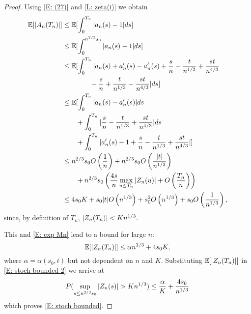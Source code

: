 \begin{proof}
    Using \ref{E: (27)} and \ref{L: zeta(i)} we obtain
    \begin{align*}
    \mathbb{E}[|A_n(T_n)|] &\leq \mathbb{E}[\int_{0}^{T_n} |a_n(s)-1|ds] \\
    &\leq \mathbb{E}[\int_{0}^{n^{2 / 3}s_0} |a_n(s)-1|ds] \\
    &\leq \mathbb{E}[
    	\int_{0}^{T_n} | a_n(s) + a'_n(s) - a'_n(s) + \frac{s}{n} - \frac{t}{n^{1 / 3}} + \frac{st}{n^{4 / 3}
    	} \\
    &\qquad \qquad - \frac{s}{n} + \frac{t}{n^{1 / 3}} - \frac{st}{n^{4 / 3}} | ds] \\
    &\leq \mathbb{E}[
    	\int_{0}^{T_n} |a_n(s) - a'_n(s)|ds \\
    	&\qquad + \int_{0}^{T_n} |\frac{s}{n} - \frac{t}{n^{1 / 3}} + \frac{st}{n^{4 / 3}}| ds \\
    	&\qquad + \int_{0}^{T_n} |a'_n(s) - 1 + \frac{s}{n} - \frac{t}{n^{1 / 3}} + \frac{st}{n^{4 / 3}}|
    ] \\
    &\leq n^{2 / 3}s_0 O\left(\frac{1}{n}\right) + n^{2 / 3}s_0 O\left(\frac{|t|}{n^{1 / 3}}\right) \\
    &\qquad +  n^{2 / 3}s_0 \left( \frac{4s}{n} \max_{u \leq T_n}|Z_n(u)| + O\left(\frac{T_n}{n}\right)\right) \\
    &\leq 4 s_0 K + s_0|t|O\left(n^{1 / 3}\right) + s_0^2O\left(n^{1 / 3}\right) + s_0O\left(\frac{1}{n^{1 / 3}}\right),
    \end{align*}
    since, by definition of $T_n$, $|Z_n(T_n)| < Kn^{1 / 3}.$
    
    This and \ref{E: exp Mn} lead to a bound for large $n$:
    \begin{equation} \label{E: bound Zn}
    \mathbb{E}[|Z_n(T_n)|] \leq \alpha n^{1 / 3} + 4s_0K,
    \end{equation}
    where $\alpha = \alpha(s_0,t)$ but not dependent on $n$ and $K$. 
    Substituting $\mathbb{E}[|Z_n(T_n)|]$ in \ref{E: stoch bounded 2} we arrive at
    \begin{equation}
    P( \sup_{s\leq n^{2/3} s_0} |Z_n(s)| > K n^{1 / 3} ) \leq \frac{\alpha}{K} + \frac{4s_0}{n^{1 / 3}}
    \end{equation}
    which proves \ref{E: stoch bounded}.
\end{proof}

